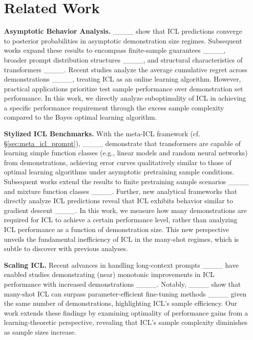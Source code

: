 \section{Related Work}
\textbf{Asymptotic Behavior Analysis.}
____ show that ICL predictions converge to posterior probabilities in asymptotic demonstration size regimes. 
Subsequent works expand these results to encompass finite-sample guarantees ____, broader prompt distribution structures ____, and structural characteristics of transformers ____. 
Recent studies analyze the average cumulative regret across demonstrations ____, treating ICL as an online learning algorithm. 
However, practical applications prioritize test sample performance over demonstration set performance.
In this work, we directly analyze suboptimality of ICL in achieving a specific performance requirement through the excess sample complexity compared to the Bayes optimal learning algorithm. 


\textbf{Stylized ICL Benchmarks.}
With the meta-ICL framework (cf. \S \ref{sec:meta_icl_prompt}), ____ demonstrate that transformers are capable of learning simple function classes (e.g., linear models and random neural networks) from demonstrations, achieving error curves qualitatively similar to those of optimal learning algorithms under asymptotic pretraining sample conditions. 
Subsequent works extend the results to finite pretraining sample scenarios ____ and mixture function classes ____. 
Further, new analytical frameworks that directly analyze ICL predictions reveal that ICL exhibits behavior similar to gradient descent ____. 
In this work, we measure how many demonstrations are required for ICL to achieve a certain performance level, rather than analyzing ICL performance as a function of demonstration size.
This new perspective unveils the fundamental inefficiency of ICL in the many-shot regimes, which is subtle to discover with previous analyses.



\textbf{Scaling ICL.}
Recent advances in handling long-context prompts ____ have enabled studies demonstrating (near) monotonic improvements in ICL performance with increased demonstrations ____. 
Notably, ____ show that many-shot ICL can surpass parameter-efficient fine-tuning methods ____ given the same number of demonstrations, highlighting ICL's sample efficiency. 
Our work extends these findings by examining optimality of performance gains from a learning-theoretic perspective, revealing that ICL's sample complexity diminishes as sample sizes increase.